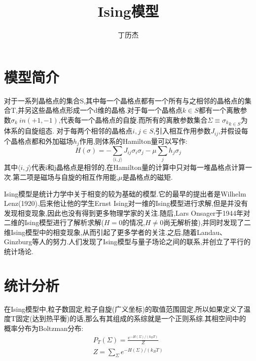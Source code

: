 \documentclass[12pt]{article} %
\title{Ising模型}
\author{丁历杰}
\date{}
\begin{document}

\maketitle
\section{模型简介}
对于一系列晶格点的集合S,其中每一个晶格点都有一个所有与之相邻的晶格点的集合T,并另这些晶格点形成一个d维的晶格.对于每一个晶格点$k\in S$都有一个离散参数$\sigma_k \ in (+1,-1)$,代表每一个晶格点的自旋.而所有的离散参数集合$\Sigma \equiv {\sigma_k}_{k\in S}$为体系的自旋组态.
对于每两个相邻的晶格点$i,j \in S$,引入相互作用参数$J_{ij}$,并假设每个晶格点都和外加磁场$h_j$作用,则体系的Hamilton量可以写作:
\begin{equation}
\label{equ: Hamilton}
H(\sigma) = -\sum_{\langle i,j \rangle}J_{ij}\sigma_{i}\sigma_{j}-\mu \sum_{j}h_{j}\sigma_{j}
\end{equation}
其中$\langle i,j \rangle$代表i和j晶格点是相邻的,在Hamilton量的计算中只对每一堆晶格点计算一次.第二项是磁场与自旋的相互作用能,$\mu$是晶格点的磁矩.

Ising模型\cite{Ising_wiki}是统计力学中关于相变的较为基础的模型.它的最早的提出者是Wilhelm Lenz(1920).后来他让他的学生Ernst Ising对一维的Ising模型进行求解,但是并没有发现相变现象,因此也没有得到更多物理学家的关注.随后,Lars Onsager于1944年对二维的Ising模型进行了解析求解($H=0$的情况,$H\neq0尚无解析接$),并同时发现了二维Ising模型中的相变现象,从而引起了更多学者的关注.之后,随着Landau、Ginzburg等人的努力.人们发现了Ising模型与量子场论之间的联系,并创立了平行的统计场论.
\section{统计分析}
在Ising模型中,粒子数固定,粒子自旋(广义坐标)的取值范围固定,所以如果定义了温度T固定(达到热平衡)的话,那么有其组成的系综就是一个正则系综.其相空间中的概率分布为Boltzman分布:
\begin{equation}
\label{equ: Distribution}
\begin{aligned}
P_{T}(\Sigma) = \frac{e^{-H(\Sigma)/(k_{B}T)}}{Z} \\
Z = \sum_{\Sigma}e^{-H(\Sigma)/(k_{B}T)}
\end{aligned}
\end{equation}
\end{document}
